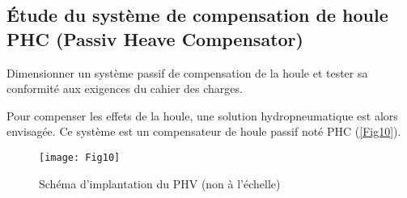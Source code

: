 \begin{multicols}{2}
\section*{Étude du système de compensation de houle PHC (Passiv Heave
Compensator)}
\begin{obj}
Dimensionner un système passif de compensation de la houle et tester sa conformité aux exigences du
cahier des charges.
\end{obj}

\ifprof
\else
Pour compenser les effets de la houle, une solution hydropneumatique est alors envisagée. Ce système est un
compensateur de houle passif noté PHC (\autoref{Fig10}).\\


\begin{figure}[H]
\centering
\texttt{[image: Fig10]}
\caption{ Schéma d’implantation du PHV (non à l’échelle)}
\label{Fig10}
\end{figure}





\end{multicols}
